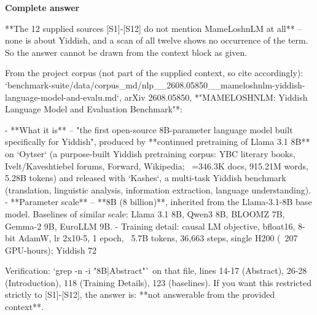 \documentclass[10pt]{article}
\begin{document}
\textbf{Complete answer}
\begin{AnswerText}
**The 12 supplied sources [S1]-[S12] do not mention MameLoshnLM at all** -- none is about Yiddish, and a scan of all twelve shows no occurrence of the term. So the answer cannot be drawn from the context block as given.

From the project corpus (not part of the supplied context, so cite accordingly): `benchmark-suite/data/corpus_md/nlp__2608.05850__mameloshnlm-yiddish-language-model-and-evalu.md`, arXiv 2608.05850, *"MAMELOSHNLM: Yiddish Language Model and Evaluation Benchmark"*:

- **What it is** -- "the first open-source 8B-parameter language model built specifically for Yiddish", produced by **continued pretraining of Llama 3.1 8B** on `Oytser` (a purpose-built Yiddish pretraining corpus: YBC literary books, Ivelt/Kaveshtiebel forums, Forward, Wikipedia; ~=346.3K docs, 915.21M words, 5.28B tokens) and released with `Kashes`, a multi-task Yiddish benchmark (translation, linguistic analysis, information extraction, language understanding).
- **Parameter scale** -- **8B (8 billion)**, inherited from the Llama-3.1-8B base model. Baselines of similar scale: Llama 3.1 8B, Qwen3 8B, BLOOMZ 7B, Gemma-2 9B, EuroLLM 9B.
- Training detail: causal LM objective, bfloat16, 8-bit AdamW, lr 2x10-5, 1 epoch, ~5.7B tokens, 36,663 steps, single H200 (~207 GPU-hours); Yiddish 72%

Verification: `grep -n -i "8B|Abstract"` on that file, lines 14-17 (Abstract), 26-28 (Introduction), 118 (Training Details), 123 (baselines). If you want this restricted strictly to [S1]-[S12], the answer is: **not answerable from the provided context**.
\end{AnswerText}
\end{document}
